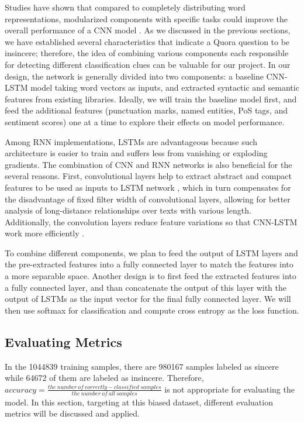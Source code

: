 \documentclass[12pt]{diazessay} %
\begin{document}
Studies have shown that compared to completely distributing word representations, modularized components with specific tasks could improve the overall performance of a CNN model \citep{poria2017}. As we discussed in the previous sections, we have established several characteristics that indicate a Quora question to be insincere; therefore, the idea of combining various components each responsible for detecting different classification clues can be valuable for our project. In our design, the network is generally divided into two components: a baseline CNN-LSTM model taking word vectors as inputs, and extracted syntactic and semantic features from existing libraries. Ideally, we will train the baseline model first, and feed the additional features (punctuation marks, named entities, PoS tags, and sentiment scores) one at a time to explore their effects on model performance. 

Among RNN implementations, LSTMs are advantageous because such architecture is easier to train and suffers less from vanishing or exploding gradients. The combination of CNN and RNN networks is also beneficial for the several reasons. First, convolutional layers help to extract abstract and compact features to be used as inputs to LSTM network \citep{chan2015}, which in turn compensates for the disadvantage of fixed filter width of convolutional layers, allowing for better analysis of long-distance relationships over texts with various length. Additionally, the convolution layers reduce feature variations so that CNN-LSTM work more efficiently \citep{ghosh2016}.

To combine different components, we plan to feed the output of LSTM layers and the pre-extracted features into a fully connected layer to match the features into a more separable space. Another design is to first feed the extracted features into a fully connected layer, and than concatenate the output of this layer with the output of LSTMs as the input vector for the final fully connected layer. We will then use softmax for classification and compute cross entropy as the loss function. 



\subsection{Evaluating Metrics}

In the \num[group-separator={,}]{1044839} training samples, there are \num[group-separator={,}]{980167} samples labeled as sincere while \num[group-separator={,}]{64672} of them are labeled as insincere. Therefore, $accuracy = \frac{ the\ number\ of\ correctly-classified\ samples}{the\ number\ of\ all\ samples}$ is not appropriate for evaluating the model. In this section, targeting at this biased dataset, different evaluation metrics will be discussed and applied.
\end{document}
